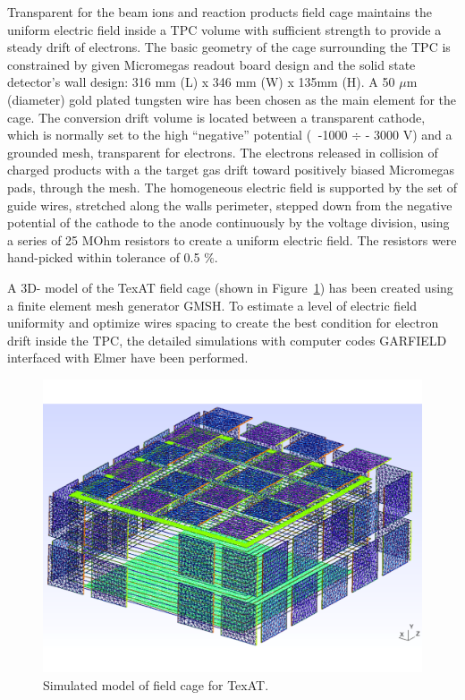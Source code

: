 \documentclass[final,number,sort&compress,5p,times,twocolumn]{elsarticle}
\begin{document}
Transparent for the beam ions and reaction products field cage maintains the uniform electric field inside a TPC volume with sufficient  strength to provide a steady drift of electrons.  The basic geometry of the cage surrounding the TPC is constrained by given Micromegas readout board design and the solid state detector's wall design: 316 mm (L) x 346 mm (W) x 135mm (H).  A 50 $\mu$m (diameter) gold plated tungsten wire has been chosen as the main element for the cage. The conversion drift volume is located between a transparent cathode, which is normally set to the high ``negative'' potential ($\>$ -1000  $\div$   - 3000 V) and a grounded mesh, transparent for electrons. The electrons released in collision of charged products with a the target gas drift toward positively biased Micromegas pads, through the mesh. The homogeneous electric field is supported by the set of guide wires, stretched along the walls perimeter, stepped down from the negative potential  of the cathode to the anode continuously by the voltage division, using a series of 25 MOhm resistors to create a uniform electric field. The resistors were hand-picked within tolerance of 0.5 $\%$.		 	 
	 
A 3D- model of the TexAT field cage (shown in Figure~\ref{fig:FieldCageSim}) has been created using a finite element mesh generator GMSH\cite{GMSH}.  To estimate a level of electric field uniformity and optimize wires spacing to create the best condition for electron drift inside the TPC,  the detailed simulations with computer codes GARFIELD \cite{GARFIELD} interfaced with Elmer \cite{Elmer} have been performed.
		
			
\begin{figure}[hbt!]
    \centering
    \includegraphics[width=1.0\columnwidth]{Figs/FieldCageSim}	
    \caption{Simulated model of field cage for TexAT.}
     \label{fig:FieldCageSim} 
\end{figure}
		
\end{document}

